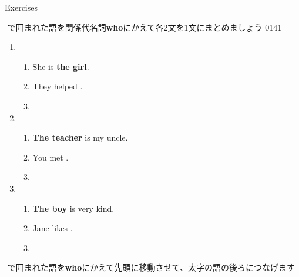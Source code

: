 \documentclass[aspectratio=169,xcolor={dvipsnames,table}]{beamer}
\begin{document}
\begin{frame}[plain]{Exercises}

{\small \fbox{　　}\,\,で囲まれた語を関係代名詞\textbf{who}にかえて各2文を1文にまとめましょう}%
\hfill{\tiny 0141}\,{\scriptsize {}}
\begin{enumerate}
 \item \begin{enumerate}
	\item She is {\bfseries the girl}.
	\item They helped .
	\item {}
       \end{enumerate}
 \item \begin{enumerate}
	\item {\bfseries The teacher} is my uncle.
	\item You met .
	\item {}
       \end{enumerate}
 \item \begin{enumerate}
	\item {\bfseries The boy} is very kind.
	\item Jane likes .
	\item {}
       \end{enumerate}
\end{enumerate} 

\hfill{\scriptsize \fbox{　　}\,\,で囲まれた語を\textbf{who}にかえて先頭に移動させて、太字の語の後ろにつなげます}
\end{frame}
\end{document}
